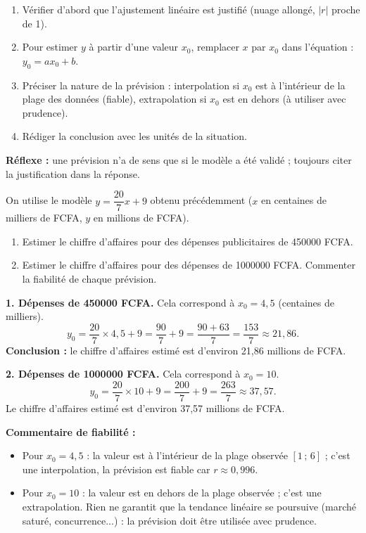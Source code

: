 \documentclass[11pt]{article}
\newcommand{\cle}[1]{{\popxbold\color{popdark}#1}}
\begin{document}
\begin{methode}
\begin{enumerate}
\item Vérifier d'abord que l'ajustement linéaire est justifié (nuage allongé, $|r|$ proche de 1).
\item Pour estimer $y$ à partir d'une valeur $x_0$, remplacer $x$ par $x_0$ dans l'équation : $y_0 = a x_0 + b$.
\item Préciser la nature de la prévision : \cle{interpolation} si $x_0$ est à l'intérieur de la plage des données (fiable), \cle{extrapolation} si $x_0$ est en dehors (à utiliser avec prudence).
\item Rédiger la conclusion avec les unités de la situation.
\end{enumerate}
\textbf{Réflexe :} une prévision n'a de sens que si le modèle a été validé ; toujours citer la justification dans la réponse.
\end{methode}

\begin{exoresolu}
On utilise le modèle $y = \dfrac{20}{7}x + 9$ obtenu précédemment ($x$ en centaines de milliers de FCFA, $y$ en millions de FCFA).
\begin{enumerate}
\item Estimer le chiffre d'affaires pour des dépenses publicitaires de \num{450000} FCFA.
\item Estimer le chiffre d'affaires pour des dépenses de \num{1000000} FCFA. Commenter la fiabilité de chaque prévision.
\end{enumerate}
\tcblower
\textbf{1. Dépenses de \num{450000} FCFA.} Cela correspond à $x_0 = 4{,}5$ (centaines de milliers).
\[ y_0 = \frac{20}{7} \times 4{,}5 + 9 = \frac{90}{7} + 9 = \frac{90 + 63}{7} = \frac{153}{7} \approx 21{,}86. \]
\textbf{Conclusion :} le chiffre d'affaires estimé est d'environ 21,86 millions de FCFA.

\textbf{2. Dépenses de \num{1000000} FCFA.} Cela correspond à $x_0 = 10$.
\[ y_0 = \frac{20}{7} \times 10 + 9 = \frac{200}{7} + 9 = \frac{263}{7} \approx 37{,}57. \]
Le chiffre d'affaires estimé est d'environ 37,57 millions de FCFA.

\textbf{Commentaire de fiabilité :}
\begin{itemize}
\item Pour $x_0 = 4{,}5$ : la valeur est à l'intérieur de la plage observée $[1\,;\,6]$ ; c'est une \cle{interpolation}, la prévision est fiable car $r \approx 0{,}996$.
\item Pour $x_0 = 10$ : la valeur est en dehors de la plage observée ; c'est une \cle{extrapolation}. Rien ne garantit que la tendance linéaire se poursuive (marché saturé, concurrence...) : la prévision doit être utilisée avec prudence.
\end{itemize}
\end{exoresolu}
\end{document}
